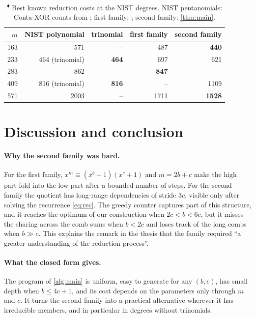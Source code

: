 \documentclass[11pt,a4paper]{article}
\theoremstyle{plain}
\theoremstyle{definition}
\newcommand{\ours}{\textsuperscript{\textcolor{cblue}{$\blacklozenge$}}}
\begin{document}
\begin{table}[t]
\centering\small
\caption{\ours{} Best known reduction costs at the NIST degrees. NIST pentanomials: Conta-XOR
counts from \cite{Banegas2015}; first family: \cite{BCP2019}; second family:
\cref{thm:main}.}
\label{tab:nist}
\begin{tabular}{@{}r r r r r@{}}
\toprule
$m$ & NIST polynomial & trinomial & first family & second family\\
\midrule
163 & 571 & -- & 487 & \textbf{440}\\
233 & 464 (trinomial) & \textbf{464} & 697 & 621\\
283 & 862 & -- & \textbf{847} & --\\
409 & 816 (trinomial) & \textbf{816} & -- & 1109\\
571 & 2003 & -- & 1711 & \textbf{1528}\\
\bottomrule
\end{tabular}
\end{table}

\section{Discussion and conclusion}\label{sec:conclusion}

\paragraph{Why the second family was hard.}
For the first family, $x^m\equiv(x^b+1)(x^c+1)$ and $m=2b+c$ make the high part fold
into the low part after a bounded number of steps. For the second family the quotient
has long-range dependencies of stride $3c$, visible only after solving the recurrence
\eqref{eq:rec}. The greedy counter captures part of this structure, and it reaches the
optimum of our construction when $2c<b<6c$, but it misses the sharing across the comb sums
when $b<2c$ and loses track of the long combs when $b\gg c$. This explains the remark in
the thesis that the family required ``a greater understanding of the reduction process''.

\paragraph{What the closed form gives.}
The program of \cref{alg:main} is uniform, easy to generate for any $(b,c)$, has small
depth when $b\le4c+1$, and its cost depends on the parameters only through $m$ and $c$.
It turns the second family into a practical alternative wherever it has irreducible
members, and in particular in degrees without trinomials.
\end{document}
